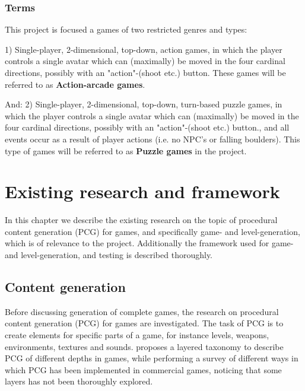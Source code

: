 \documentclass[a4paper,titlepage,final, twoside]{report}
\begin{document}
\subsection{Terms}
This project is focused a games of two restricted genres and types: 

1) Single-player, 2-dimensional, top-down, action games, in which the player controls a single avatar which can (maximally) be moved in the four cardinal directions, possibly with an "action"-(shoot etc.) button.
These games will be referred to as \textbf{Action-arcade games}.

And: 2) Single-player, 2-dimensional, top-down, turn-based puzzle games, in which the player controls a single avatar which can (maximally) be moved in the four cardinal directions, possibly with an "action"-(shoot etc.) button., and all events occur as a result of player actions (i.e. no NPC's or falling boulders). 
This type of games will be referred to as \textbf{Puzzle games} in the project.

\chapter{Existing research and framework}
In this chapter we describe the existing research on the topic of procedural content generation (PCG) for games, and specifically game- and level-generation, which is of relevance to the project.
Additionally the framework used for game- and level-generation, and testing is described thoroughly.



\section{Content generation}

Before discussing generation of complete games, the research on procedural content generation (PCG) for games are investigated. 
The task of PCG is to create elements for specific parts of a game, for instance levels, weapons, environments, textures and sounds. 
\citet{hendrikx2013procedural} proposes a layered taxonomy to describe PCG of different depths in games, while performing a survey of different ways in which PCG has been implemented in commercial games, noticing that some layers has not been thoroughly explored.
\end{document}
